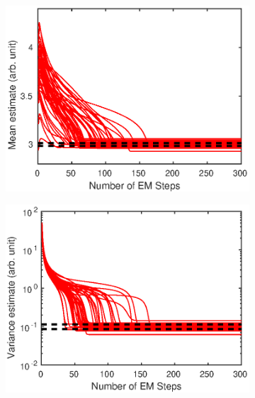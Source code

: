 \documentclass[12pt]{report}
\begin{document}
\begin{figure}
	\centering
	\begin{subfigure}{0.45\textwidth}
		\includegraphics[width=\textwidth]{figures/hierarchicalModel/EM_repeat_mean.eps}
	\end{subfigure}
	\begin{subfigure}{0.45\textwidth}
		\includegraphics[width=\textwidth]{figures/hierarchicalModel/EM_repeat_variance.eps}
	\end{subfigure}
	\begin{subfigure}{0.45\textwidth}

\end{subfigure}
\end{figure}
\end{document}

